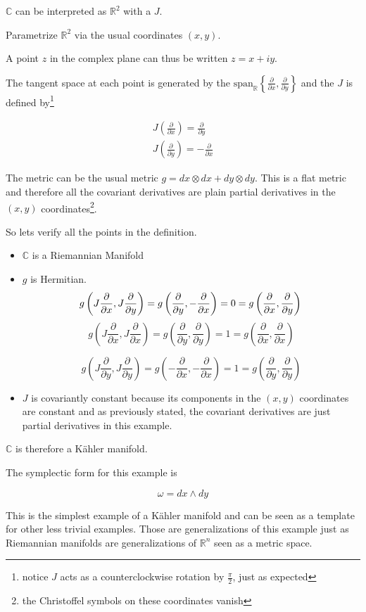 \documentclass[12pt]{article}
\begin{document}
$\mathbb{C}$ can be interpreted as $\mathbb{R}^2$ with a  $J$.

Parametrize $\mathbb{R}^2$ via the usual coordinates $(x,y)$.

A point $z$ in the complex plane can thus be written $z=x+iy$.

The tangent space at each point is generated by the $\mathrm{span}_{\mathbb{R}} \left\{ \frac{\partial}{\partial x}, \frac{\partial}{\partial y}\right\}$ and the  $J$ is defined by\footnote{notice $J$ acts as a counterclockwise rotation by $\frac{\pi}{2}$, just as expected}

\begin{align}
J\left( \frac{\partial}{\partial x} \right) = \frac{\partial}{\partial y} \\
J\left( \frac{\partial}{\partial y} \right) = - \frac{\partial}{\partial x}
\end{align}

The metric can be the usual metric $g = dx\otimes dx + dy\otimes dy$.
This is a flat metric and therefore all the covariant derivatives are plain partial derivatives in the $(x,y)$ coordinates\footnote{the Christoffel symbols on these coordinates vanish}.

So lets verify all the points in the definition.

\begin{itemize}
\item $\mathbb{C}$ is a Riemannian Manifold
\item $g$ is Hermitian.
$$
g\left(J\frac{\partial}{\partial x}, J\frac{\partial}{\partial y}\right) = g\left(\frac{\partial}{\partial y},-\frac{\partial}{\partial x} \right)=0=g\left(\frac{\partial}{\partial x}, \frac{\partial}{\partial y}\right) \\
$$
$$
g\left(J\frac{\partial}{\partial x}, J\frac{\partial}{\partial x}\right) = g\left(\frac{\partial}{\partial y}, \frac{\partial}{\partial y}\right)=1 = g\left(\frac{\partial}{\partial x}, \frac{\partial}{\partial x}\right)
$$

$$
g\left(J\frac{\partial}{\partial y}, J\frac{\partial}{\partial y}\right) = g\left(-\frac{\partial}{\partial x}, -\frac{\partial}{\partial x}\right)=1 = g\left(\frac{\partial}{\partial y}, \frac{\partial}{\partial y}\right)
$$

\item $J$ is covariantly constant because its components in the $(x,y)$ coordinates are constant and as previously stated, the covariant derivatives are just partial derivatives in this example.

\end{itemize}

$\mathbb{C}$ is therefore a K\"ahler manifold.

The symplectic form for this example is

$$\omega = dx \wedge dy $$

This is the simplest example of a K\"ahler manifold and can be seen as a template for other less trivial examples. Those are generalizations of this example just as Riemannian manifolds are generalizations of $\mathbb{R}^n$  seen as a metric space.
\end{document}
